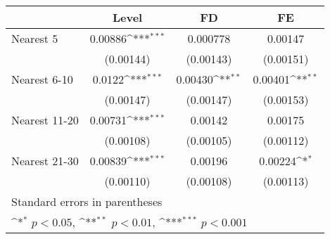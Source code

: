 {
\def\sym#1{\ifmmode^{#1}\else\(^{#1}\)\fi}
\begin{tabular}{l*{3}{c}}
\hline\hline
            &\multicolumn{1}{c}{Level}&\multicolumn{1}{c}{FD}&\multicolumn{1}{c}{FE}\\
\hline
Nearest 5   &     0.00886\sym{***}&    0.000778         &     0.00147         \\
            &   (0.00144)         &   (0.00143)         &   (0.00151)         \\
[1em]
Nearest 6-10&      0.0122\sym{***}&     0.00430\sym{**} &     0.00401\sym{**} \\
            &   (0.00147)         &   (0.00147)         &   (0.00153)         \\
[1em]
Nearest 11-20&     0.00731\sym{***}&     0.00142         &     0.00175         \\
            &   (0.00108)         &   (0.00105)         &   (0.00112)         \\
[1em]
Nearest 21-30&     0.00839\sym{***}&     0.00196         &     0.00224\sym{*}  \\
            &   (0.00110)         &   (0.00108)         &   (0.00113)         \\
\hline\hline
\multicolumn{4}{l}{\footnotesize Standard errors in parentheses}\\
\multicolumn{4}{l}{\footnotesize \sym{*} \(p<0.05\), \sym{**} \(p<0.01\), \sym{***} \(p<0.001\)}\\
\end{tabular}
}
